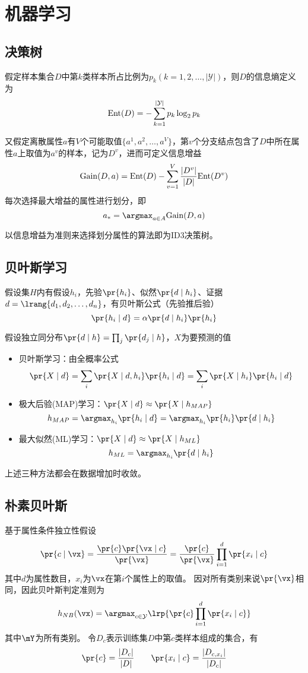 
\section{机器学习}

\subsection{决策树}
假定样本集合$D$中第$k$类样本所占比例为$p_k(k=1,2,\ldots,|\mathcal{Y}|)$，则$D$的信息熵定义为
\[\mathrm{Ent}(D)=-\sum_{k=1}^{|\mathcal{Y}|}p_k\log_2 p_k\]

又假定离散属性$a$有$V$个可能取值$\{a^1,a^2,\ldots,a^V\}$，第$v$个分支结点包含了$D$中所在属性$a$上取值为$a^v$的样本，记为$D^v$，进而可定义信息增益
\[\mathrm{Gain}(D,a)=\mathrm{Ent}(D)-\sum_{v=1}^V\frac{|D^v|}{|D|}\mathrm{Ent}(D^v)\]
每次选择最大增益的属性进行划分，即
\[a_*=\argmax_{a\in A}\mathrm{Gain}(D,a)\]

以信息增益为准则来选择划分属性的算法即为ID3决策树。

\subsection{贝叶斯学习}
假设集$H$内有假设$h_i$，先验$\pr{h_i}$、似然$\pr{d\mid h_i}$、证据$d=\lrang{d_1,d_2,\ldots,d_n}$，有贝叶斯公式（先验推后验）
\[\pr{h_i\mid d}=\alpha\pr{d\mid h_i}\pr{h_i}\]

假设独立同分布$\pr{d\mid h}=\prod_j\pr{d_j\mid h}$，$X$为要预测的值
\begin{itemize}
	\item 贝叶斯学习：由全概率公式
	\[\pr{X\mid d}=\sum_i\pr{X\mid d,h_i}\pr{h_i\mid d}=\sum_i\pr{X\mid h_i}\pr{h_i\mid d}\]
	\item 极大后验(MAP)学习：$\pr{X\mid d}\approx\pr{X\mid h_{MAP}}$
	\[h_{MAP}=\argmax_{h_i}\pr{h_i\mid d}=\argmax_{h_i}\pr{h_i}\pr{d\mid h_i}\]
	\item 最大似然(ML)学习：$\pr{X\mid d}\approx\pr{X\mid h_{ML}}$
	\[h_{ML}=\argmax_{h_i}\pr{d\mid h_i}\]
\end{itemize}
上述三种方法都会在数据增加时收敛。

\subsection{朴素贝叶斯}
基于属性条件独立性假设
\[\pr{c\mid\vx}=\frac{\pr{c}\pr{\vx\mid c}}{\pr{\vx}}=\frac{\pr{c}}{\pr{\vx}}\prod_{i=1}^d\pr{x_i\mid c}\]
其中$d$为属性数目，$x_i$为$\vx$在第$i$个属性上的取值。
因对所有类别来说$\pr{\vx}$相同，因此贝叶斯判定准则为
\[h_{NB}(\vx)=\argmax_{c\in\mathcal{Y}}\lrp{\pr{c}\prod_{i=1}^d\pr{x_i\mid c}}\]
其中$\mY$为所有类别。
令$D_c$表示训练集$D$中第$c$类样本组成的集合，有
\[\pr{c}=\frac{|D_c|}{|D|}\qquad\pr{x_i\mid c}=\frac{|D_{c,x_i}|}{|D_c|}\]

